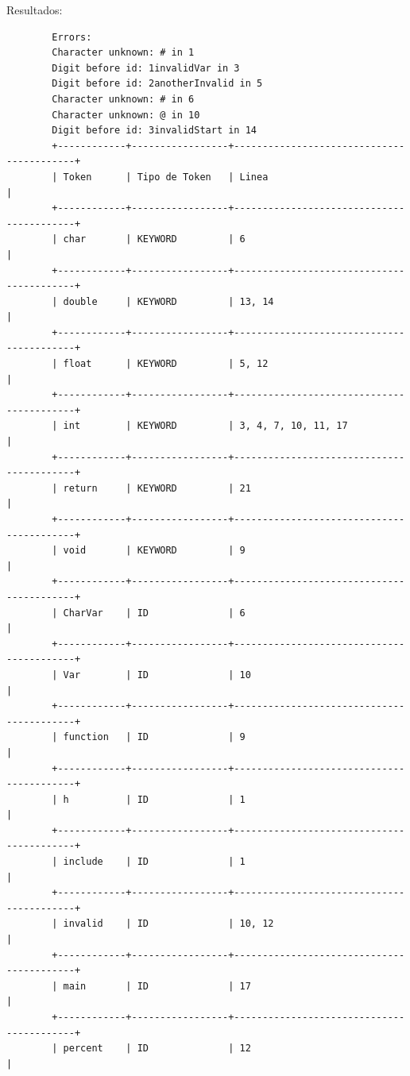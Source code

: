 \documentclass[a4paper,12pt]{article}
\begin{document}
\begin{flushleft}
	Resultados:
	\begin{verbatim}
		Errors: 
		Character unknown: # in 1
		Digit before id: 1invalidVar in 3
		Digit before id: 2anotherInvalid in 5
		Character unknown: # in 6
		Character unknown: @ in 10
		Digit before id: 3invalidStart in 14
		+------------+-----------------+------------------------------------------+
		| Token      | Tipo de Token   | Linea                                    |
		+------------+-----------------+------------------------------------------+
		| char       | KEYWORD         | 6                                        |
		+------------+-----------------+------------------------------------------+
		| double     | KEYWORD         | 13, 14                                   |
		+------------+-----------------+------------------------------------------+
		| float      | KEYWORD         | 5, 12                                    |
		+------------+-----------------+------------------------------------------+
		| int        | KEYWORD         | 3, 4, 7, 10, 11, 17                      |
		+------------+-----------------+------------------------------------------+
		| return     | KEYWORD         | 21                                       |
		+------------+-----------------+------------------------------------------+
		| void       | KEYWORD         | 9                                        |
		+------------+-----------------+------------------------------------------+
		| CharVar    | ID              | 6                                        |
		+------------+-----------------+------------------------------------------+
		| Var        | ID              | 10                                       |
		+------------+-----------------+------------------------------------------+
		| function   | ID              | 9                                        |
		+------------+-----------------+------------------------------------------+
		| h          | ID              | 1                                        |
		+------------+-----------------+------------------------------------------+
		| include    | ID              | 1                                        |
		+------------+-----------------+------------------------------------------+
		| invalid    | ID              | 10, 12                                   |
		+------------+-----------------+------------------------------------------+
		| main       | ID              | 17                                       |
		+------------+-----------------+------------------------------------------+
		| percent    | ID              | 12                                       |

\end{verbatim}
\end{flushleft}
\end{document}
